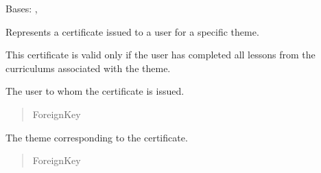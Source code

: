 \documentclass[letterpaper,10pt,english]{sphinxmanual}
\begin{document}
\begin{fulllineitems}
\label{\detokenize{certificates:certificates.models.Certificate}}
\pysigstartsignatures
\pysiglinewithargsret
{}
{\sphinxparamcomma {}}
{}
\pysigstopsignatures
\sphinxAtStartPar
Bases: {\hyperref[\detokenize{core:core.models.AuditableMixin}]{}}, 

\sphinxAtStartPar
Represents a certificate issued to a user for a specific theme.

\sphinxAtStartPar
This certificate is valid only if the user has completed all lessons
from the curriculums associated with the theme.

\begin{fulllineitems}
\label{\detokenize{certificates:certificates.models.Certificate.user}}
\pysigstartsignatures
\pysigline
{}
\pysigstopsignatures
\sphinxAtStartPar
The user to whom the certificate is issued.
\begin{quote}\begin{description}
\sphinxAtStartPar
ForeignKey

\end{description}\end{quote}

\end{fulllineitems}


\begin{fulllineitems}
\label{\detokenize{certificates:certificates.models.Certificate.theme}}
\pysigstartsignatures
\pysigline
{}
\pysigstopsignatures
\sphinxAtStartPar
The theme corresponding to the certificate.
\begin{quote}\begin{description}
\sphinxAtStartPar
ForeignKey

\end{description}\end{quote}


\end{fulllineitems}
\end{fulllineitems}
\end{document}
